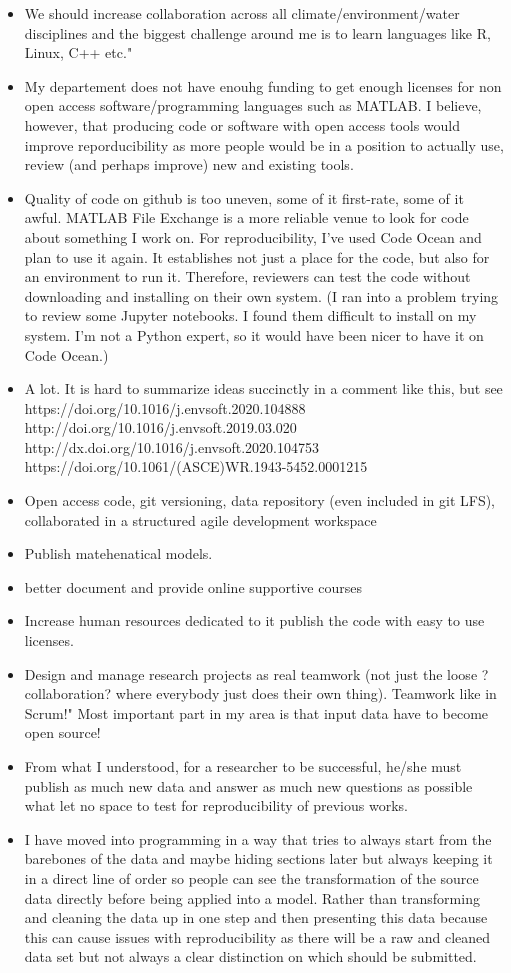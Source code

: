 \documentclass{article}
\begin{document}
\begin{itemize}
	\item We should increase collaboration across all climate/environment/water disciplines and the biggest challenge around me is to learn languages like R, Linux, C++ etc."
	\item My departement does not have enouhg funding to get enough licenses for non open access software/programming languages such as MATLAB. I believe, however, that producing code or software with open access tools would improve reporducibility as more people would be in a position to actually use, review (and perhaps improve) new and existing tools.
	\item Quality of code on github is too uneven, some of it first-rate, some of it awful. MATLAB File Exchange is a more reliable venue to look for code about something I work on.
For reproducibility, I've used Code Ocean and plan to use it again. It establishes not just a place for the code, but also for an environment to run it. Therefore, reviewers can test the code without downloading and installing on their own system.
(I ran into a problem trying to review some Jupyter notebooks. I found them difficult to install on my system. I'm not a Python expert, so it would have been nicer to have it on Code Ocean.)
	\item A lot.  It is hard to summarize ideas succinctly in a comment like this, but see 
https://doi.org/10.1016/j.envsoft.2020.104888
http://doi.org/10.1016/j.envsoft.2019.03.020
http://dx.doi.org/10.1016/j.envsoft.2020.104753
https://doi.org/10.1061/(ASCE)WR.1943-5452.0001215
	\item Open access code, git versioning, data repository (even included in git LFS), collaborated in a structured agile development workspace
	\item Publish matehenatical models.
	\item better document and provide online supportive courses
	\item Increase human resources dedicated to it publish the code with easy to use licenses.
	\item Design and manage research projects as real teamwork (not just the loose ?collaboration? where everybody just does their own thing). Teamwork like in Scrum!"
Most important part in my area is that input data have to become open source!
	\item From what I understood, for a researcher to be successful, he/she must publish as much new data and answer as much new questions as possible what let no space to test for reproducibility of previous works.
	\item I have moved into programming in a way that tries to always start from the barebones of the data and maybe hiding sections later but always keeping it in a direct line of order so people can see the transformation of the source data directly before being applied into a model. Rather than transforming and cleaning the data up in one step and then presenting this data because this can cause issues with reproducibility as there will be a raw and cleaned data set but not always a clear distinction on which should be submitted.

\end{itemize}
\end{document}
